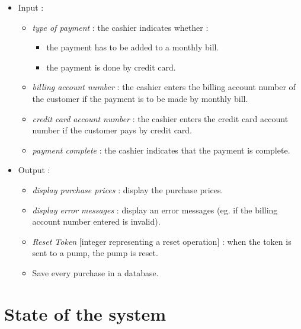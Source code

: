 \documentclass[11pt, a4paper]{article}
\newcommand{\data}[1]{\textit{#1}}
\begin{document}
\begin{itemize}
\item Input :
		\begin{itemize}
		\item \data{type of payment} : the cashier indicates whether : 
					\begin{itemize}
					\item the payment has to be added to a monthly bill.
					\item the payment is done by credit card.
					\end{itemize}
		\item \data{billing account number} : the cashier enters the billing account number of the customer if the payment is to be made by monthly bill.
		\item \data{credit card account number} : the cashier enters the credit card account number if the customer pays by credit card.
		\item \data{payment complete} : the cashier indicates that the payment is complete.
		\end{itemize}

\item Output :
		\begin{itemize}
		\item \data{display purchase prices} : display the purchase prices.
		\item \data{display error messages} : display an error messages (eg. if the billing account number entered is invalid).
    \item \data{Reset Token} [integer representing a reset operation] : when the token is sent to a pump, the pump is reset.
    \item Save every purchase in a database.
		\end{itemize}
\end{itemize}


\bigskip

\section{State of the system}
\end{document}
